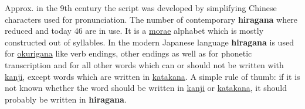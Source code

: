 

Approx. in the 9th century the \lhiragana{} script was developed by simplifying
Chinese characters used for pronunciation. The number of contemporary
\textbf{hiragana} where reduced and today 46 are in use. It is a
\hyperref[sec:Mora]{morae} alphabet which is mostly constructed out of
syllables. In the modern Japanese language \textbf{hiragana} is used for
\hyperref[sec:Okurigana]{okurigana} like verb endings, other endings as well as
for phonetic transcription and for all other words which can or should not be
written with \hyperref[sec:Kanji]{kanji}, except words which are written in
\hyperref[sec:Katakana]{katakana}. A simple rule of thumb: if it is not known
whether the word should be written in \hyperref[sec:Kanji]{kanji} or
\hyperref[sec:Katakana]{katakana}, it should probably be written in
\textbf{hiragana}.
